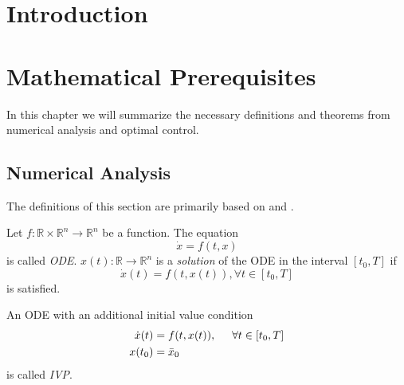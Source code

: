 \documentclass[a4paper, 12pt]{scrreprt} %
\begin{document}

\chapter{Introduction}
\label{chap:Introduction}


\chapter{Mathematical Prerequisites}
\label{chap:mp}
In this chapter we will summarize the necessary definitions and theorems from numerical analysis and optimal control.

\section{Numerical Analysis}
\label{sec:na}
The definitions of this section are primarily based on \cite{sodei} and \cite{ngd}.
\begin{definition}
Let $f:\mathbb R \times \mathbb R^n \to \mathbb R^n$ be a function. The equation
\begin{equation}
\dot{x} = f(t,x)
\label{eq:ODE}
\end{equation}
is called \emph{\ac{ODE}}. $x(t):\mathbb R \to \mathbb R^n$ is a \emph{solution} of the \ac{ODE} in the interval $[t_0, T]$ if
\begin{equation}
\dot x(t) = f\left(t,x(t)\right), \forall t \in [t_0, T]
\label{eq:ODE2}
\end{equation}
is satisfied.
\end{definition}

\begin{definition}
An \ac{ODE} with an additional initial value condition 
\begin{align}
\label{eq:ivp}
\begin{split}
\dot{x}(t) &= f(t, x(t)), \hspace{0.5cm} \forall t \in [t_0, T]\\
x(t_0) &= \bar x_0
\end{split}
\end{align}
is called \emph{\ac{IVP}}.
\end{definition}
\end{document}
